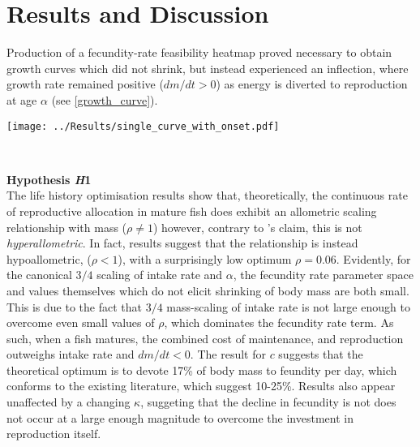 \documentclass[a4paper]{article} %
\begin{document}
\section{Results and Discussion}\thispagestyle{plain}
Production of a fecundity-rate feasibility heatmap proved necessary to obtain growth curves which did not shrink, but instead experienced an inflection, where growth rate remained positive ($dm/dt > 0$) as energy is diverted to reproduction at age $\alpha$ (see \cref{growth_curve}).
\begin{center}
    \begin{minipage}{0.8\linewidth}
        \texttt{[image: ../Results/single\_curve\_with\_onset.pdf]}
        \label{growth_curve}
    \end{minipage}\\
\end{center}
\vspace{0.5cm}
\textbf{Hypothesis \textit{H}1} \\
The life history optimisation results show that, theoretically, the continuous rate of reproductive allocation in mature fish does exhibit an allometric scaling relationship with mass ($\rho \neq 1$) however, contrary to \cite{Marshall2019b}'s claim, this is not \textit{hyperallometric}. In fact, results suggest that the relationship is instead hypoallometric, ($\rho < 1$), with a surprisingly low optimum $\rho = 0.06$. Evidently, for the canonical $3/4$ scaling of intake rate and $\alpha$, the fecundity rate parameter space and values themselves which do not elicit shrinking of body mass are both small. This is due to the fact that $3/4$ mass-scaling of intake rate is not large enough to overcome even small values of $\rho$, which dominates the fecundity rate term. As such, when a fish matures, the combined cost of maintenance, and reproduction outweighs intake rate and $dm/dt < 0$. The result for $c$ suggests that the theoretical optimum is to devote 17\% of body mass to feundity per day, which conforms to the existing literature, which suggest 10-25\%. Results also appear unaffected by a changing $\kappa$, suggeting that the decline in fecundity is not does not occur at a large enough magnitude to overcome the investment in reproduction itself.
\end{document}
